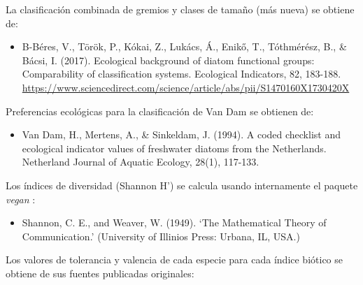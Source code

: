 \documentclass[
]{book}
\providecommand{\tightlist}{%
  \setlength{\itemsep}{0pt}\setlength{\parskip}{0pt}}
\begin{document}
La clasificación combinada de gremios y clases de tamaño (más nueva) se obtiene de:

\begin{itemize}
\tightlist
\item
  B-Béres, V., Török, P., Kókai, Z., Lukács, Á., Enikő, T., Tóthmérész, B., \& Bácsi, I. (2017). Ecological background of diatom functional groups: Comparability of classification systems. Ecological Indicators, 82, 183-188. \url{https://www.sciencedirect.com/science/article/abs/pii/S1470160X1730420X}
\end{itemize}

Preferencias ecológicas para la clasificación de Van Dam se obtienen de:

\begin{itemize}
\tightlist
\item
  Van Dam, H., Mertens, A., \& Sinkeldam, J. (1994). A coded checklist and ecological indicator values of freshwater diatoms from the Netherlands. Netherland Journal of Aquatic Ecology, 28(1), 117-133.
\end{itemize}

Los índices de diversidad (Shannon H') se calcula usando internamente el paquete \emph{vegan} \citep{vegan}:

\begin{itemize}
\tightlist
\item
  Shannon, C. E., and Weaver, W. (1949). `The Mathematical Theory of Communication.' (University of Illinios Press: Urbana, IL, USA.)
\end{itemize}

Los valores de tolerancia y valencia de cada especie para cada índice biótico se obtiene de sus fuentes publicadas originales:
\end{document}
